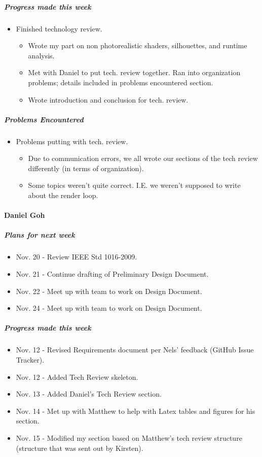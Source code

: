 {\subparagraph{Progress made this week}
\begin{itemize}
  \item Finished technology review.
  \begin{itemize}
    \item Wrote my part on non photorealistic shaders, silhouettes, and runtime analysis.
    \item Met with Daniel to put tech. review together. Ran into organization problems; details included in problems encountered section.
    \item Wrote introduction and conclusion for tech. review.
  \end{itemize}
\end{itemize}

\subparagraph{Problems Encountered}
\begin{itemize}
  \item Problems putting with tech. review.
  \begin{itemize}
    \item Due to communication errors, we all wrote our sections of the tech review differently (in terms of organization).
    \item Some topics weren't quite correct. I.E. we weren't supposed to write about the render loop.
  \end{itemize}
\end{itemize}

\vspace{3mm}

\paragraph{Daniel Goh}
\subparagraph{Plans for next week}
\begin{itemize}
  \item Nov. 20 - Review IEEE Std 1016-2009.
  \item Nov. 21 - Continue drafting of Preliminary Design Document.
  \item Nov. 22 - Meet up with team to work on Design Document.
  \item Nov. 24 - Meet up with team to work on Design Document.
\end{itemize}

\subparagraph{Progress made this week}
\begin{itemize}
  \item Nov. 12 - Revised Requirements document per Nels' feedback (GitHub Issue Tracker).
  \item Nov. 12 - Added Tech Review skeleton.
  \item Nov. 13 - Added Daniel's Tech Review section.
  \item Nov. 14 - Met up with Matthew to help with Latex tables and figures for his section.
  \item Nov. 15 - Modified my section based on Matthew's tech review structure (structure that was sent out by Kirsten).
\end{itemize}

}

